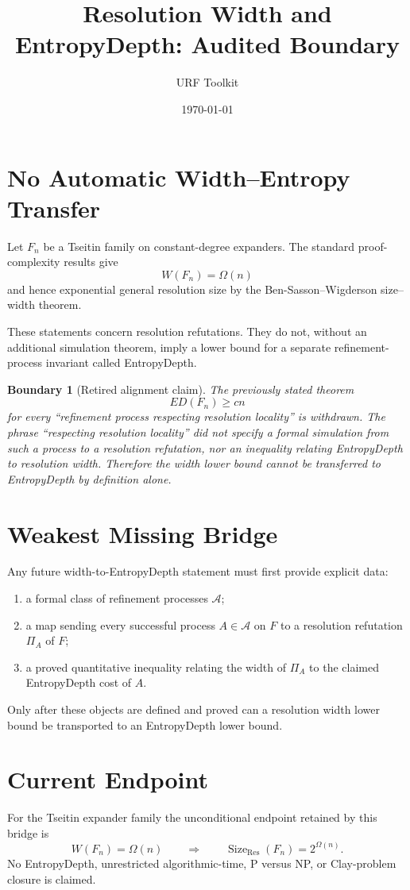 \documentclass{article}
\title{Resolution Width and EntropyDepth: Audited Boundary}
\author{URF Toolkit}
\date{\today}
\newtheorem{boundary}{Boundary}
\begin{document}
\maketitle

\section{No Automatic Width--Entropy Transfer}

Let $F_n$ be a Tseitin family on constant-degree expanders.  The standard
proof-complexity results give
\[
W(F_n)=\Omega(n)
\]
and hence exponential general resolution size by the Ben-Sasson--Wigderson
size--width theorem.

These statements concern resolution refutations.  They do not, without an
additional simulation theorem, imply a lower bound for a separate
refinement-process invariant called EntropyDepth.

\begin{boundary}[Retired alignment claim]
The previously stated theorem
\[
ED(F_n)\ge c n
\]
for every ``refinement process respecting resolution locality'' is withdrawn.
The phrase ``respecting resolution locality'' did not specify a formal
simulation from such a process to a resolution refutation, nor an inequality
relating EntropyDepth to resolution width.  Therefore the width lower bound
cannot be transferred to EntropyDepth by definition alone.
\end{boundary}

\section{Weakest Missing Bridge}

Any future width-to-EntropyDepth statement must first provide explicit data:

\begin{enumerate}
\item a formal class of refinement processes $\mathcal A$;
\item a map sending every successful process $A\in\mathcal A$ on $F$ to a
      resolution refutation $\Pi_A$ of $F$;
\item a proved quantitative inequality relating the width of $\Pi_A$ to the
      claimed EntropyDepth cost of $A$.
\end{enumerate}

Only after these objects are defined and proved can a resolution width lower
bound be transported to an EntropyDepth lower bound.

\section{Current Endpoint}

For the Tseitin expander family the unconditional endpoint retained by this
bridge is
\[
W(F_n)=\Omega(n)
\qquad\Longrightarrow\qquad
\operatorname{Size}_{\mathrm{Res}}(F_n)=2^{\Omega(n)}.
\]
No EntropyDepth, unrestricted algorithmic-time, P versus NP, or Clay-problem
closure is claimed.
\end{document}
